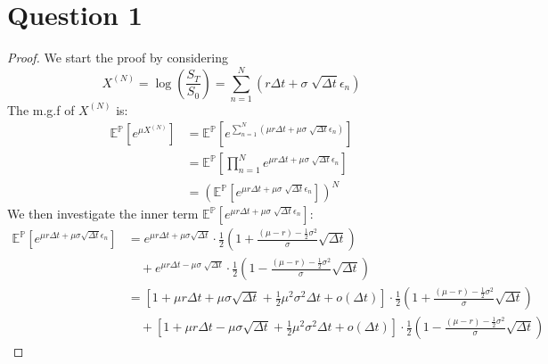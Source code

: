 \documentclass[12pt, letterpaper]{article}
\begin{document}
\part*{Question 1}
\begin{proof}
We start the proof by considering \[X^{(N)} = \log(\frac{S_T}{S_0}) = \sum_{n=1}^N (r\Delta t+\sigma \sqrt[]{\Delta t} \epsilon_n)\]
The m.g.f of $X^{(N)}$ is: \\
\begin{align*}
  \mathbb{E}^\mathbb{P}[e^{\mu X^{(N)}}] & =  \mathbb{E}^\mathbb{P}[e^{\sum_{n=1}^N (\mu r\Delta t+\mu\sigma \sqrt[]{\Delta t} \epsilon_n)}] \\
  & = \mathbb{E}^\mathbb{P} [\prod_{n=1}^N e^{\mu r\Delta t+\mu\sigma \sqrt[]{\Delta t} \epsilon_n}] \\
  & = (\mathbb{E}^\mathbb{P} [e^{\mu r\Delta t+\mu\sigma \sqrt[]{\Delta t} \epsilon_n}])^N \tag*{as $\epsilon_n$ is i.i.d}
\end{align*}
We then investigate the inner term $\mathbb{E}^\mathbb{P} [e^{\mu r\Delta t+\mu\sigma \sqrt[]{\Delta t} \epsilon_n}]$:
\begin{align*}
  \mathbb{E}^\mathbb{P} [e^{\mu r\Delta t+\mu\sigma \sqrt{\Delta t} \epsilon_n}] &= e^{\mu r\Delta t +\mu\sigma \sqrt{\Delta t}} \cdot \frac{1}{2} (1 + \frac{(\mu -r) - \frac{1}{2}\sigma^2}{\sigma} \sqrt{\Delta t}) \\ 
    & \quad + e^{\mu r\Delta t-\mu\sigma \sqrt[]{\Delta t}} \cdot \frac{1}{2} (1 - \frac{(\mu -r) - \frac{1}{2}\sigma^2}{\sigma} \sqrt{\Delta t}) \\
    &= [1+\mu r\Delta t+\mu \sigma \sqrt{\Delta t} +\frac{1}{2}\mu^2\sigma^2\Delta t + o(\Delta t)] \cdot \frac{1}{2} (1 + \frac{(\mu -r) - \frac{1}{2}\sigma^2}{\sigma} \sqrt{\Delta t}) \\ 
    & \quad + [1+\mu r\Delta t-\mu \sigma \sqrt{\Delta t} +\frac{1}{2}\mu^2\sigma^2\Delta t + o(\Delta t)] \cdot \frac{1}{2} (1 - \frac{(\mu -r) - \frac{1}{2}\sigma^2}{\sigma} \sqrt{\Delta t}) 
\end{align*}


\end{proof}
\end{document}
